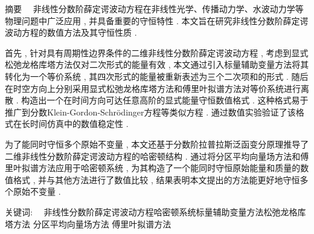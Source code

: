 
\begin{ChineseAbstract}[副教授]%
\item {\heiti 摘要\ \ }
非线性分数阶薛定谔波动方程在非线性光学、传播动力学、水波动力学等物理问题中广泛应用 , 并具备重要的守恒特性 . 本文旨在研究非线性分数阶薛定谔波动方程的数值方法及其守恒性质 . 

首先 , 针对具有周期性边界条件的二维非线性分数阶薛定谔波动方程 , 考虑到显式松弛龙格库塔方法仅对二次形式的能量有效 , 本文通过引入标量辅助变量方法将其转化为一个等价系统 , 其四次形式的能量被重新表述为三个二次项和的形式 . 
随后在时空方向上分别采用显式松弛龙格库塔方法和傅里叶拟谱方法对等价系统进行离散 . 构造出一个在时间方向可达任意高阶的显式能量守恒数值格式 . 
这种格式易于推广到分数Klein-Gordon-Schr{\"o}dinger方程等类似方程 . 
通过数值实验验证了该格式在长时间仿真中的数值稳定性 . 

为了能同时守恒多个原始不变量 , 本文还基于分数阶拉普拉斯泛函变分原理推导了二维非线性分数阶薛定谔波动方程的哈密顿结构 . 
通过将分区平均向量场方法和傅里叶拟谱方法应用于哈密顿系统 , 为其构造了一个能同时守恒原始能量和质量的数值格式 , 
并与其他方法进行了数值比较 , 结果表明本文提出的方法能更好地守恒多个原始不变量 . 

\item {\heiti 关键词:\ \ } 非线性分数阶薛定谔波动方程\qquad 哈密顿系统\qquad 标量辅助变量方法\qquad 松弛龙格库塔方法 \qquad 分区平均向量场方法 \qquad 傅里叶拟谱方法
\end{ChineseAbstract}
